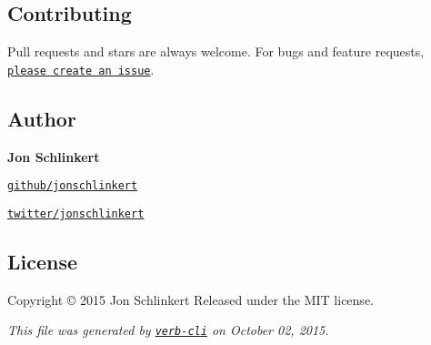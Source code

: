 \subsection*{Contributing}

Pull requests and stars are always welcome. For bugs and feature requests, \href{https://github.com/jonschlinkert/is-glob/issues/new}{\tt please create an issue}.

\subsection*{Author}

{\bfseries Jon Schlinkert}


\begin{DoxyItemize}
\item \href{https://github.com/jonschlinkert}{\tt github/jonschlinkert}
\item \href{http://twitter.com/jonschlinkert}{\tt twitter/jonschlinkert}
\end{DoxyItemize}

\subsection*{License}

Copyright © 2015 Jon Schlinkert Released under the M\+IT license.





{\itshape This file was generated by \href{https://github.com/assemble/verb-cli}{\tt verb-\/cli} on October 02, 2015.} 